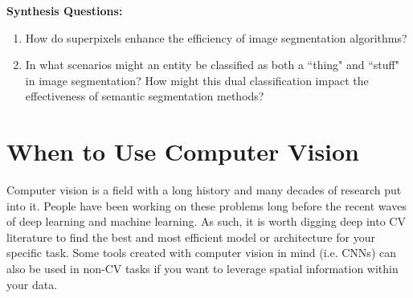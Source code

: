 \vspace{10px}
\begin{questionbox}
    \textbf{Synthesis Questions:}
    \begin{enumerate}    
        \item How do superpixels enhance the efficiency of image segmentation algorithms?
        \item In what scenarios might an entity be classified as both a ``thing" and ``stuff" in image segmentation? How might this dual classification impact the effectiveness of semantic segmentation methods?
    \end{enumerate}
    \vspace{1px}
\end{questionbox}

\section{When to Use Computer Vision}
\begin{flushleft}
    \large Computer vision is a field with a long history and many decades of research put into it. People have been working on these problems long before the recent waves of deep learning and machine learning. As such, it is worth digging deep into CV literature to find the best and most efficient model or architecture for your specific task. Some tools created with computer vision in mind (i.e. CNNs) can also be used in non-CV tasks if you want to leverage spatial information within your data.
\end{flushleft}

